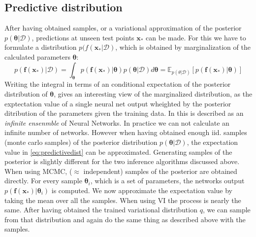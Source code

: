 \documentclass{article}
\begin{document}
\subsection{Predictive distribution}
After having obtained samples, or a variational approximation of the posterior $p(\bm \theta|\mathcal{D})$, predictions at unseen test points $\bm x_*$ can be made. For this we have to formulate a distribution $p(f(\bm x_*|\mathcal{D})$, which is obtained by marginalization of the calculated parameters $\bm \theta$:
\begin{equation}\label{eq:predictivedist}
    p(\bm f( \bm x_*) |\mathcal{D}) = \int_{\bm \theta} p(\bm f ({\bm x_*})|\bm \theta ) p(\bm \theta | \mathcal{D})d \bm \theta = \mathbb{E}_{p(\theta|\mathcal{D})} \left[ p(\bm f ({\bm x_*})|\bm \theta )\right]
\end{equation}
Writing the integral in terms of an conditional expectation of the posterior distribution of $\bm \theta$, gives an interesting view of the marginalized distribution, as the exptectation value of a single neural net output wheighted by the posterior ditribution of the parameters given the training data. In \cite{blundell2015weightuncertaintyneuralnetworks} this is described as an \textit{infinite ensenmble} of Neural Networks. In practice we can not calculate an infinite number of networks. However when having obtained enough iid. samples (monte carlo samples) of the posterior distribution $p(\bm \theta|\mathcal{D})$, the expectation value in \eqref{eq:predictivedist} can be approximated. Generating samples of the posterior is slightly different for the two inference algorithms discussed above. When using MCMC, ($\approx$ independent) samples of the posterior are obtained directly. For every sample $\bm \theta_i$, which is a set of parameters, the networks output $p(\bm f(\bm x_*)|\bm \theta_i)$ is computed. We now approximate the expectation value by taking the mean over all the samples. When using VI the process is nearly the same. After having obtained the trained variational distribution $q$, we can sample from that distribution and again do the same thing as described above with the samples. 
\end{document}
